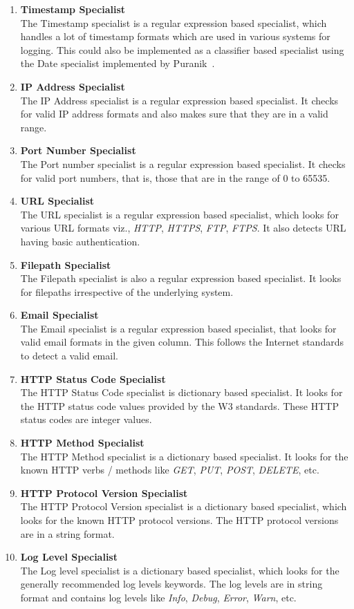 \begin{enumerate}
\item \textbf{Timestamp Specialist}\\
The Timestamp specialist is a regular expression based specialist, which handles a lot of timestamp formats which are used in various systems for logging. This could also be implemented as a classifier based specialist using the Date specialist implemented by Puranik~\cite{puranik2012specialist}.
\item \textbf{IP Address Specialist}\\
The IP Address specialist is a regular expression based specialist. It checks for valid IP address formats and also makes sure that they are in a valid range.
\item \textbf{Port Number Specialist}\\
The Port number specialist is a regular expression based specialist. It checks for valid port numbers, that is, those that are in the range of 0 to 65535.
\item \textbf{URL Specialist}\\
The URL specialist is a regular expression based specialist, which looks for various URL formats viz., \textit{HTTP}, \textit{HTTPS}, \textit{FTP}, \textit{FTPS}. It also detects URL having basic authentication.
\item \textbf{Filepath Specialist}\\
The Filepath specialist is also a regular expression based specialist. It looks for filepaths irrespective of the underlying system.
\item \textbf{Email Specialist}\\
The Email specialist is a regular expression based specialist, that looks for valid email formats in the given column. This follows the Internet standards to detect a valid email.
\item \textbf{HTTP Status Code Specialist}\\
The HTTP Status Code specialist is dictionary based specialist. It looks for the HTTP status code values provided by the W3 standards. These HTTP status codes are integer values.
\item \textbf{HTTP Method Specialist}\\
The HTTP Method specialist is a dictionary based specialist. It looks for the known HTTP verbs / methods like \textit{GET}, \textit{PUT}, \textit{POST}, \textit{DELETE}, etc.
\item \textbf{HTTP Protocol Version Specialist}\\
The HTTP Protocol Version specialist is a dictionary based specialist, which looks for the known HTTP protocol versions. The HTTP protocol versions are in a string format.
\item \textbf{Log Level Specialist}\\
The Log level specialist is a dictionary based specialist, which looks for the generally recommended log levels keywords. The log levels are in string format and contains log levels like \textit{Info}, \textit{Debug}, \textit{Error}, \textit{Warn}, etc.
\end{enumerate}

